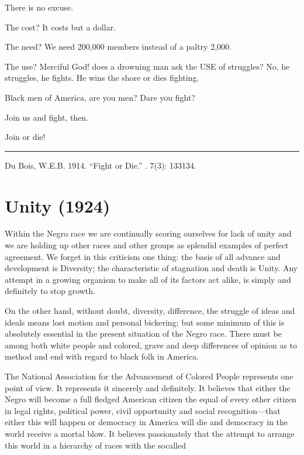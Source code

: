 \documentclass[letterpaper,10pt,english]{jupyterBook}
\begin{document}
\sphinxAtStartPar
There is no excuse.

\sphinxAtStartPar
The cost? It costs but a dollar.

\sphinxAtStartPar
The need? We need 200,000 members instead of a paltry 2,000.

\sphinxAtStartPar
The use? Merciful God! does a drowning man ask the USE of struggles? No, he struggles, he fights. He wins the shore or dies fighting.

\sphinxAtStartPar
Black men of America, are you men? Dare you fight?

\sphinxAtStartPar
Join us and fight, then.

\sphinxAtStartPar
Join or die!


\bigskip\hrule\bigskip


\sphinxAtStartPar
{} Du Bois, W.E.B. 1914. “Fight or Die.” . 7(3): 133\sphinxhyphen{}134.


\section{Unity (1924)}
\label{\detokenize{Volumes/28/03/unity:unity-1924}}\label{\detokenize{Volumes/28/03/unity::doc}}
\sphinxAtStartPar
Within the Negro race we are continually scoring ourselves for lack of unity and we are holding up other races and other groups as splendid examples of perfect agreement. We forget in this criticism one thing: the basis of all advance and development is Diversity; the characteristic of stagnation and death is Unity. Any attempt in a growing organism to make all of its factors act alike, is simply and definitely to stop growth.

\sphinxAtStartPar
On the other hand, without doubt, diversity, difference, the struggle of ideas and ideals means lost motion and personal bickering; but some minimum of this is absolutely essential in the present situation of the Negro race. There must be among both white people and colored, grave and deep differences of opinion as to method and end with regard to black folk in America.

\sphinxAtStartPar
The National Association for the Advancement of Colored People represents one point of view. It represents it sincerely and definitely. It believes that either the Negro will become a full fledged American citizen the equal of every other citizen in legal rights, political power, civil opportunity and social recognition—that either this will happen or democracy in America will die and democracy in the world receive a mortal blow. It believes passionately that the attempt to arrange this world in a hierarchy of races with the so\sphinxhyphen{}called
\end{document}
